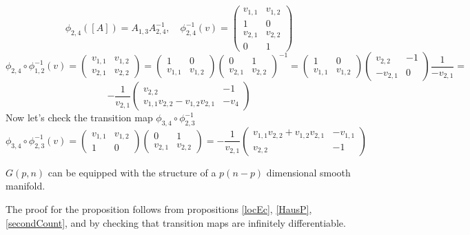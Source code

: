 \documentclass[11pt,a4paper]{report}
\begin{document}
$$ \phi_{2,4}([A]) = A_{1,3} A_{2,4}^{-1}, \quad \phi_{2,4}^{-1}(v) = 
\begin{pmatrix}
v_{1,1} & v_{1,2} \\
1 & 0 \\
v_{2,1} & v_{2,2} \\
0 & 1
\end{pmatrix}
$$
$$ \phi_{2,4} \circ \phi_{1,2}^{-1}(v) = 
\begin{pmatrix}
v_{1,1} & v_{1,2} \\
v_{2,1} & v_{2,2}
\end{pmatrix} =
\begin{pmatrix}
    1 & 0 \\
    v_{1,1} & v_{1,2}
\end{pmatrix}
\begin{pmatrix}
    0 & 1 \\
    v_{2,1} & v_{2,2}
\end{pmatrix} ^{-1}
= 
\begin{pmatrix}
    1 & 0 \\
    v_{1,1} & v_{1,2}
\end{pmatrix}
\begin{pmatrix}
    v_{2,2} & -1 \\
    -v_{2,1} & 0
\end{pmatrix} \frac{1}{-v_{2,1}} = 
$$
$$ -\frac{1}{v_{2,1}} \begin{pmatrix} v_{2,2} & -1 \\ v_{1,1} v_{2,2} - v_{1,2} v_{2,1} & -v_{4} \end{pmatrix}
$$
\newline
Now let's check the transition map $ \phi_{3,4} \circ \phi_{2,3}^{-1} $ 
$$ \phi_{3,4} \circ \phi_{2,3}^{-1} (v) =
\begin{pmatrix} v_{1,1} &  v_{1,2} \\ 1 & 0 \end{pmatrix} 
\begin{pmatrix} 0 & 1 \\ v_{2,1} & v_{2,2} \end{pmatrix} = 
-\frac{1}{v_{2,1}} \begin{pmatrix} v_{1,1} v_{2,2} + v_{1,2} v_{2,1} & -v_{1,1} \\ v_{2,2} & -1 \end{pmatrix}
$$ 
\begin{Prop}
$G(p,n)$ can be equipped with the structure of a $p (n-p) $ dimensional smooth manifold.
\end{Prop}
The proof for the proposition follows from propositions \ref{locEc}, \ref{HausP}, \ref{secondCount},
and by checking that transition maps are infinitely differentiable.
\end{document}
